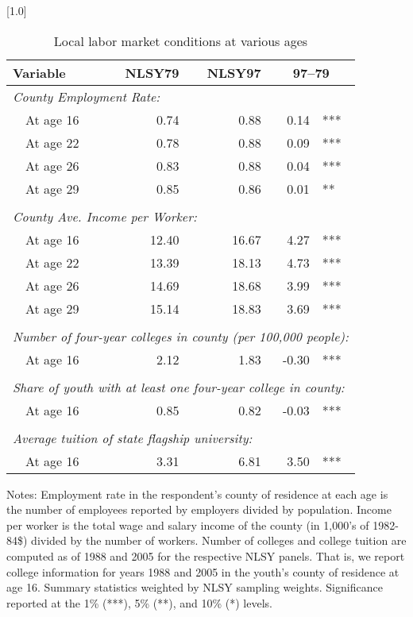 \begin{table}[ht]
\caption{Local labor market conditions at various ages}
\label{tab:locallabmktbyage}
\centering
\scalebox{1.0}[1.0]{%
\begin{threeparttable}
\begin{tabular}{lrrr@{}l}
\toprule 
Variable \phantom{extraspacehere} & NLSY79 & NLSY97 & \multicolumn{2}{c}{97--79} \\
\midrule 
\multicolumn{5}{l}{\emph{County Employment Rate:}} \\
~~At age 16                      & 0.74 & 0.88 & 0.14 & *** \\ 
~~At age 22                      & 0.78 & 0.88 & 0.09 & *** \\ 
~~At age 26                      & 0.83 & 0.88 & 0.04 & *** \\ 
~~At age 29                      & 0.85 & 0.86 & 0.01 & ** \\ 
\vspace{-6pt}  \\
\multicolumn{5}{l}{\emph{County Ave. Income per Worker:}} \\
~~At age 16                      & 12.40 & 16.67 & 4.27 & *** \\ 
~~At age 22                      & 13.39 & 18.13 & 4.73 & *** \\ 
~~At age 26                      & 14.69 & 18.68 & 3.99 & *** \\ 
~~At age 29                      & 15.14 & 18.83 & 3.69 & *** \\ 
\vspace{-6pt}  \\
\multicolumn{5}{l}{\emph{Number of four-year colleges in county (per 100,000 people):}} \\
~~At age 16                      & 2.12 & 1.83 & -0.30 & *** \\ 
\vspace{-6pt}  \\
\multicolumn{5}{l}{\emph{Share of youth with at least one four-year college in county:}} \\
~~At age 16                      & 0.85 & 0.82 & -0.03 & *** \\ 
\vspace{-6pt}  \\
\multicolumn{5}{l}{\emph{Average tuition of state flagship university:}} \\~~At age 16                      & 3.31 & 6.81 & 3.50 & *** \\ 
\bottomrule 
\end{tabular} 
\footnotesize{Notes: Employment rate in the respondent's county of residence at each age is the number of employees reported by employers divided by population. Income per worker is the total wage and salary income of the county (in 1,000's of 1982-84\$) divided by the number of workers. Number of colleges and college tuition are computed as of 1988 and 2005 for the respective NLSY panels. That is, we report college information for years 1988 and 2005 in the youth's county of residence at age 16. Summary statistics weighted by NLSY sampling weights. Significance reported at the 1\% (***), 5\% (**), and 10\% (*) levels.}
\end{threeparttable} 
} 
\end{table} 
